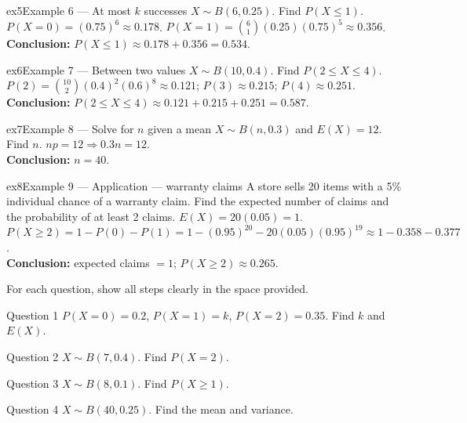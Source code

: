 \documentclass[11pt]{article}
\begin{document}
\begin{example}{ex5}{Example 6 --- At most $k$ successes}
$X\sim B(6,0.25)$. Find $P(X\leq1)$.\soln
$P(X=0)=(0.75)^6\approx0.178$. $P(X=1)=\binom61(0.25)(0.75)^5\approx0.356$.\\[3pt]\textbf{Conclusion:} $P(X\leq1)\approx0.178+0.356=0.534$.
\end{example}

\begin{example}{ex6}{Example 7 --- Between two values}
$X\sim B(10,0.4)$. Find $P(2\leq X\leq4)$.\soln
$P(2)=\binom{10}2(0.4)^2(0.6)^8\approx0.121$; $P(3)\approx0.215$; $P(4)\approx0.251$.\\[3pt]\textbf{Conclusion:} $P(2\leq X\leq4)\approx0.121+0.215+0.251=0.587$.
\end{example}

\begin{example}{ex7}{Example 8 --- Solve for $n$ given a mean}
$X\sim B(n,0.3)$ and $E(X)=12$. Find $n$.\soln
$np=12\Rightarrow0.3n=12$.\\[3pt]\textbf{Conclusion:} $n=40$.
\end{example}

\begin{example}{ex8}{Example 9 --- Application --- warranty claims}
A store sells 20 items with a 5\% individual chance of a warranty claim. Find the expected number of claims and the probability of at least 2 claims.\soln
$E(X)=20(0.05)=1$. $P(X\geq2)=1-P(0)-P(1)=1-(0.95)^{20}-20(0.05)(0.95)^{19}\approx1-0.358-0.377$.\\[3pt]\textbf{Conclusion:} expected claims $=1$; $P(X\geq2)\approx0.265$.
\end{example}

\clearpage
{}
For each question, show all steps clearly in the space provided.

\begin{qbox}{Question 1}
$P(X=0)=0.2$, $P(X=1)=k$, $P(X=2)=0.35$. Find $k$ and $E(X)$.\workspace{2.4cm}
\end{qbox}

\begin{qbox}{Question 2}
$X\sim B(7,0.4)$. Find $P(X=2)$.\workspace{2.4cm}
\end{qbox}

\begin{qbox}{Question 3}
$X\sim B(8,0.1)$. Find $P(X\geq1)$.\workspace{2.4cm}
\end{qbox}

\begin{qbox}{Question 4}
$X\sim B(40,0.25)$. Find the mean and variance.\workspace{2.4cm}
\end{qbox}
\end{document}
